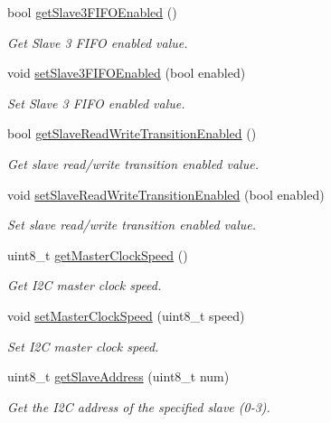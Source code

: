 \begin{DoxyCompactItemize}
bool \mbox{\hyperlink{classMPU6050_a9d75ec63e2320ecfb84a2b082397f900}{get\+Slave3\+F\+I\+F\+O\+Enabled}} ()
\begin{DoxyCompactList}\small\item\em Get Slave 3 F\+I\+FO enabled value. \end{DoxyCompactList}\item 
void \mbox{\hyperlink{classMPU6050_a6ed713870c7f6d085ded91a45515a36c}{set\+Slave3\+F\+I\+F\+O\+Enabled}} (bool enabled)
\begin{DoxyCompactList}\small\item\em Set Slave 3 F\+I\+FO enabled value. \end{DoxyCompactList}\item 
bool \mbox{\hyperlink{classMPU6050_a6b3c3aab80fcaa384303f9df2a59d7eb}{get\+Slave\+Read\+Write\+Transition\+Enabled}} ()
\begin{DoxyCompactList}\small\item\em Get slave read/write transition enabled value. \end{DoxyCompactList}\item 
void \mbox{\hyperlink{classMPU6050_a3413efbf2f4e8a27aa8768d9bc34d663}{set\+Slave\+Read\+Write\+Transition\+Enabled}} (bool enabled)
\begin{DoxyCompactList}\small\item\em Set slave read/write transition enabled value. \end{DoxyCompactList}\item 
uint8\+\_\+t \mbox{\hyperlink{classMPU6050_a4cda448ef5c5736bd14188947342d636}{get\+Master\+Clock\+Speed}} ()
\begin{DoxyCompactList}\small\item\em Get I2C master clock speed. \end{DoxyCompactList}\item 
void \mbox{\hyperlink{classMPU6050_a8a4779ea709ff0633f9798369478400b}{set\+Master\+Clock\+Speed}} (uint8\+\_\+t speed)
\begin{DoxyCompactList}\small\item\em Set I2C master clock speed. \end{DoxyCompactList}\item 
uint8\+\_\+t \mbox{\hyperlink{classMPU6050_af75b9f7ccac48515c7544238db0e6863}{get\+Slave\+Address}} (uint8\+\_\+t num)
\begin{DoxyCompactList}\small\item\em Get the I2C address of the specified slave (0-\/3). \end{DoxyCompactList}\item 

\end{DoxyCompactItemize}
